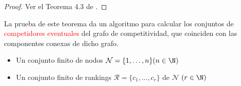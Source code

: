 \begin{proof}
Ver el Teorema 4.3 de \cite{journals/corr/CriadoGPR13a}.
\end{proof}

La prueba de este teorema da un algoritmo para calcular los conjuntos de \textcolor{red}{competidores eventuales} del grafo de competitividad, que coinciden con las componentes conexas de dicho grafo.

\begin{algorithm}\label{algoritmo}
 \Input{}
 \begin{itemize}
 	\item Un conjunto finito de nodos $\mathcal{N} = \{1,\dots, n\} (n \in \N)$
 	\item Un conjunto finito de rankings $\mathcal{R} = \{c_1,\dots,c_r\}$ de $\mathcal{N}$ $(r \in \N)$
 \end{itemize}
 
 
 
 \end{algorithm}

